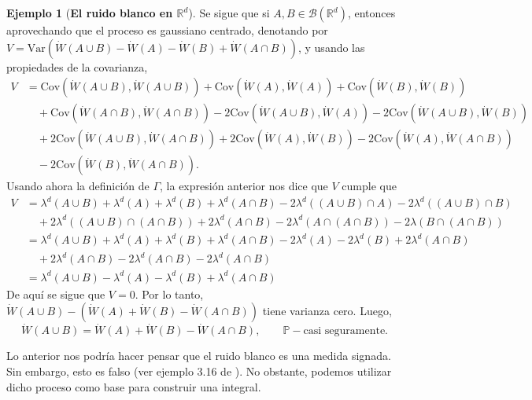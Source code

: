 \documentclass[letterpaper,twoside,12pt]{book}
\newcommand{\R}{\mathbb{R}}
\newcommand{\B}{\mathcal{B}}
\renewcommand{\P}{\mathbb{P}}
\newcommand{\W}{\dot{W}}
\newcommand{\1}{\mathds{1}}
\theoremstyle{definition}
\theoremstyle{definition}
\theoremstyle{remark}
\theoremstyle{definition}
\theoremstyle{definition}
\theoremstyle{definition}
\theoremstyle{definition}
\newtheorem{ejem}{Ejemplo}
\theoremstyle{definition}
\begin{document}
\begin{ejem}[\textbf{El ruido blanco en $\R^{d}$}]
Se sigue que si $A,B\in \B(\R^d)$, entonces aprovechando que el proceso es gaussiano centrado, denotando por $V=\text{Var}\left(\W(A\cup B)-\W(A)-\W(B)+\W(A\cap B)\right)$, y usando las propiedades de la covarianza, 
\begin{align*}
    V &=\text{Cov}\left(\W(A\cup B),\W(A\cup B)\right)+\text{Cov}\left(\W(A),\W(A)\right)+\text{Cov}\left(\W(B),\W(B)\right)\\
    &\quad +\text{Cov}\left(\W(A\cap B),\W(A\cap B)\right)-2 \text{Cov}\left(\W(A\cup B),\W(A)\right)-2 \text{Cov}\left(\W(A\cup B), \W(B)\right)\\
    &\quad +2 \text{Cov}\left(\W(A\cup B), \W(A\cap B)\right)+2 \text{Cov}\left(\W(A),\W(B)\right)-2 \text{Cov}\left(\W(A),\W(A\cap B)\right)\\
    &\quad -2 \text{Cov}\left(\W(B),\W(A\cap B)\right).
\end{align*}
Usando ahora la definición de $\Gamma$, la expresión anterior nos dice que $V$ cumple que
   \begin{align*}
      V &= \lambda^{d}(A\cup B)+\lambda^{d}(A)+\lambda^{d}(B)+\lambda^{d}(A\cap B)-2\lambda^{d}((A\cup B)\cap A)-2\lambda^{d}((A\cup B)\cap B)\\
       &\quad+2\lambda^{d}((A\cup B)\cap (A\cap B))+2\lambda^{d}(A\cap B)-2\lambda^{d}(A\cap (A\cap B))-2\lambda(B\cap(A\cap B))\\
       &=\lambda^{d}(A\cup B)+\lambda^d(A)+\lambda^{d}(B)+\lambda^{d}(A\cap B)-2\lambda^{d}(A)-2\lambda^{d}(B)+2\lambda^{d}(A\cap B)\\
       &\quad +2\lambda^{d}(A\cap B)-2\lambda^{d}(A\cap B)-2\lambda^{d}(A\cap B)\\
       &=\lambda^{d}(A\cup B)-\lambda^d(A)-\lambda^{d}(B)+\lambda^{d}(A\cap B)
   \end{align*}
   De aquí se sigue que $V=0$. Por lo tanto, $\W(A\cup B)-(\W(A)+\W(B)-\W(A\cap B))$ tiene varianza cero. Luego,
\begin{equation}\label{Wdotmeasure}    
    \W(A\cup B)=\W(A)+\W(B)-\W(A\cap B), \qquad \P-\text{casi seguramente}.
\end{equation}


\end{ejem}
Lo anterior nos podría hacer pensar que el ruido blanco es una medida signada. Sin embargo, esto es falso (ver ejemplo 3.16 de \cite{Khoshnevisan2009}). No obstante, podemos utilizar dicho proceso como base para construir una integral.
\end{document}

